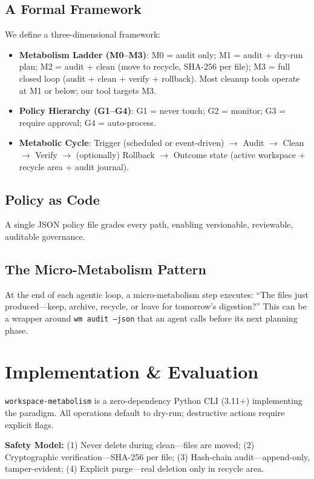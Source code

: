 \documentclass[sigconf]{acmart}
\begin{document}
\subsection{A Formal Framework}
We define a three-dimensional framework:
\begin{itemize}
\item \textbf{Metabolism Ladder (M0--M3)}: M0 = audit only; M1 = audit + dry-run plan; M2 = audit + clean (move to recycle, SHA-256 per file); M3 = full closed loop (audit + clean + verify + rollback). Most cleanup tools operate at M1 or below; our tool targets M3.
\item \textbf{Policy Hierarchy (G1--G4)}: G1 = never touch; G2 = monitor; G3 = require approval; G4 = auto-process.
\item \textbf{Metabolic Cycle}: Trigger (scheduled or event-driven) $\rightarrow$ Audit $\rightarrow$ Clean $\rightarrow$ Verify $\rightarrow$ (optionally) Rollback $\rightarrow$ Outcome state (active workspace + recycle area + audit journal).
\end{itemize}

\subsection{Policy as Code}
A single JSON policy file grades every path, enabling versionable, reviewable, auditable governance.

\subsection{The Micro-Metabolism Pattern}
At the end of each agentic loop, a micro-metabolism step executes: ``The files just produced---keep, archive, recycle, or leave for tomorrow's digestion?'' This can be a wrapper around \texttt{wm audit --json} that an agent calls before its next planning phase.

\section{Implementation \& Evaluation}
\texttt{workspace-metabolism} is a zero-dependency Python CLI (3.11+) implementing the paradigm. All operations default to dry-run; destructive actions require explicit flags.

\textbf{Safety Model:} (1) Never delete during clean---files are moved; (2) Cryptographic verification---SHA-256 per file; (3) Hash-chain audit---append-only, tamper-evident; (4) Explicit purge---real deletion only in recycle area.
\end{document}
